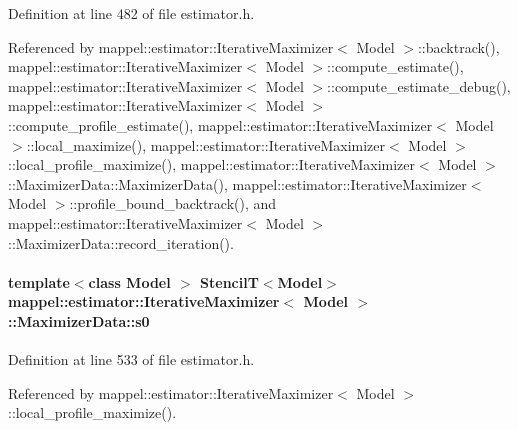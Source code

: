 Definition at line 482 of file estimator.\+h.



Referenced by mappel\+::estimator\+::\+Iterative\+Maximizer$<$ Model $>$\+::backtrack(), mappel\+::estimator\+::\+Iterative\+Maximizer$<$ Model $>$\+::compute\+\_\+estimate(), mappel\+::estimator\+::\+Iterative\+Maximizer$<$ Model $>$\+::compute\+\_\+estimate\+\_\+debug(), mappel\+::estimator\+::\+Iterative\+Maximizer$<$ Model $>$\+::compute\+\_\+profile\+\_\+estimate(), mappel\+::estimator\+::\+Iterative\+Maximizer$<$ Model $>$\+::local\+\_\+maximize(), mappel\+::estimator\+::\+Iterative\+Maximizer$<$ Model $>$\+::local\+\_\+profile\+\_\+maximize(), mappel\+::estimator\+::\+Iterative\+Maximizer$<$ Model $>$\+::\+Maximizer\+Data\+::\+Maximizer\+Data(), mappel\+::estimator\+::\+Iterative\+Maximizer$<$ Model $>$\+::profile\+\_\+bound\+\_\+backtrack(), and mappel\+::estimator\+::\+Iterative\+Maximizer$<$ Model $>$\+::\+Maximizer\+Data\+::record\+\_\+iteration().

\paragraph[{\texorpdfstring{s0}{s0}}]{\setlength{\rightskip}{0pt plus 5cm}template$<$class Model $>$ {\bf StencilT}$<$Model$>$ {\bf mappel\+::estimator\+::\+Iterative\+Maximizer}$<$ Model $>$\+::Maximizer\+Data\+::s0\hspace{0.3cm}{\ttfamily [protected]}}\hypertarget{classmappel_1_1estimator_1_1IterativeMaximizer_1_1MaximizerData_a10660729fb16b8b8ab4f719562e5b87c}{}\label{classmappel_1_1estimator_1_1IterativeMaximizer_1_1MaximizerData_a10660729fb16b8b8ab4f719562e5b87c}


Definition at line 533 of file estimator.\+h.



Referenced by mappel\+::estimator\+::\+Iterative\+Maximizer$<$ Model $>$\+::local\+\_\+profile\+\_\+maximize().

